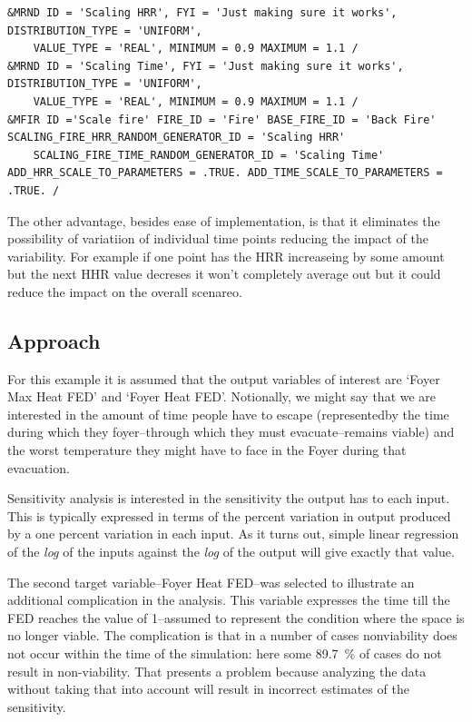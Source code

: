 \documentclass[12pt,twoside]{book}
\begin{document}
\vspace{\baselineskip}
\begin{lstlisting}
&MRND ID = 'Scaling HRR', FYI = 'Just making sure it works', DISTRIBUTION_TYPE = 'UNIFORM',
    VALUE_TYPE = 'REAL', MINIMUM = 0.9 MAXIMUM = 1.1 /
&MRND ID = 'Scaling Time', FYI = 'Just making sure it works', DISTRIBUTION_TYPE = 'UNIFORM',
    VALUE_TYPE = 'REAL', MINIMUM = 0.9 MAXIMUM = 1.1 /
&MFIR ID ='Scale fire' FIRE_ID = 'Fire' BASE_FIRE_ID = 'Back Fire' SCALING_FIRE_HRR_RANDOM_GENERATOR_ID = 'Scaling HRR'
    SCALING_FIRE_TIME_RANDOM_GENERATOR_ID = 'Scaling Time' ADD_HRR_SCALE_TO_PARAMETERS = .TRUE. ADD_TIME_SCALE_TO_PARAMETERS = .TRUE. /
\end{lstlisting}

The other advantage, besides ease of implementation, is that it eliminates the possibility of variatiion of individual time points reducing the impact of the variability. For example if one point has the HRR increaseing by some amount but the next HHR value decreses it won't completely average out but it could reduce the impact on the overall scenareo.

\hypertarget{approach}{%
\subsection{Approach}\label{approach}}

For this example it is assumed that the output variables of interest are `Foyer Max Heat FED' and `Foyer Heat FED'. Notionally, we might say that we are interested in the amount of time people have to escape (representedby the time during which they foyer--through which they must evacuate--remains viable) and the worst temperature they might have to face in the Foyer during that evacuation.

Sensitivity analysis is interested in the sensitivity the output has to each input. This is typically expressed in terms of the percent variation in output produced by a one percent variation in each input. As it turns out, simple linear regression of the \emph{log} of the
inputs against the \emph{log} of the output will give exactly that value.

The second target variable--Foyer Heat FED--was selected to illustrate an additional complication in the analysis. This variable expresses the time till the FED reaches the value of 1--assumed to represent the condition where the space is no longer viable. The complication is that in a number of cases nonviability does not occur within the time of the simulation: here some 89.7~\% of cases do not result in non-viability. That presents a problem because analyzing the data without taking that into account will result in incorrect estimates of the sensitivity.
\end{document}
